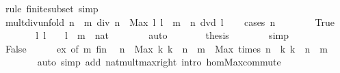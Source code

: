\begin{isabellebody}
\ {\isacharparenleft}{\kern0pt}rule\ finite{\isacharunderscore}{\kern0pt}subset{\isacharparenright}{\kern0pt}\ simp\isanewline
\ \ \isamarkupfalse%
\isanewline
\ \ \isamarkupfalse%
\ mult{\isacharunderscore}{\kern0pt}div{\isacharunderscore}{\kern0pt}unfold{\isacharcolon}{\kern0pt}\ {\isachardoublequoteopen}n\ {\isacharasterisk}{\kern0pt}\ {\isacharparenleft}{\kern0pt}m\ div\ n{\isacharparenright}{\kern0pt}\ {\isacharequal}{\kern0pt}\ Max\ {\isacharbraceleft}{\kern0pt}l{\isachardot}{\kern0pt}\ l\ {\isasymle}\ m\ {\isasymand}\ n\ dvd\ l{\isacharbraceright}{\kern0pt}{\isachardoublequoteclose}\isanewline
\ \ \isamarkupfalse%
\ {\isacharparenleft}{\kern0pt}cases\ {\isachardoublequoteopen}n\ {\isacharequal}{\kern0pt}\ {}{\isachardoublequoteclose}{\isacharparenright}{\kern0pt}\isanewline
\ \ \ \ \isamarkupfalse%
\ True\isanewline
\ \ \ \ \isamarkupfalse%
\ \isamarkupfalse%
\ {\isachardoublequoteopen}{\isacharbraceleft}{\kern0pt}l{\isachardot}{\kern0pt}\ l\ {\isacharequal}{\kern0pt}\ {}\ {\isasymand}\ l\ {\isasymle}\ m{\isacharbraceright}{\kern0pt}\ {\isacharequal}{\kern0pt}\ {\isacharbraceleft}{\kern0pt}{}{\isacharcolon}{\kern0pt}{\isacharcolon}{\kern0pt}nat{\isacharbraceright}{\kern0pt}{\isachardoublequoteclose}\isanewline
\ \ \ \ \ \ \isamarkupfalse%
\ auto\isanewline
\ \ \ \ \isamarkupfalse%
\ \isamarkupfalse%
\ {\isacharquery}{\kern0pt}thesis\isanewline
\ \ \ \ \ \ \isamarkupfalse%
\ simp\isanewline
\ \ \isamarkupfalse%
\isanewline
\ \ \ \ \isamarkupfalse%
\ False\isanewline
\ \ \ \ \isamarkupfalse%
\ ex\ {\isacharbrackleft}{\kern0pt}of\ m{\isacharbrackright}{\kern0pt}\ fin\ \isamarkupfalse%
\ {\isachardoublequoteopen}n\ {\isacharasterisk}{\kern0pt}\ Max\ {\isacharbraceleft}{\kern0pt}k{\isachardot}{\kern0pt}\ k\ {\isacharasterisk}{\kern0pt}\ n\ {\isasymle}\ m{\isacharbraceright}{\kern0pt}\ {\isacharequal}{\kern0pt}\ Max\ {\isacharparenleft}{\kern0pt}times\ n\ {\isacharbackquote}{\kern0pt}\ {\isacharbraceleft}{\kern0pt}k{\isachardot}{\kern0pt}\ k\ {\isacharasterisk}{\kern0pt}\ n\ {\isasymle}\ m{\isacharbraceright}{\kern0pt}{\isacharparenright}{\kern0pt}{\isachardoublequoteclose}\isanewline
\ \ \ \ \ \ \isamarkupfalse%
\ {\isacharparenleft}{\kern0pt}auto\ simp\ add{\isacharcolon}{\kern0pt}\ nat{\isacharunderscore}{\kern0pt}mult{\isacharunderscore}{\kern0pt}max{\isacharunderscore}{\kern0pt}right\ intro{\isacharcolon}{\kern0pt}\ hom{\isacharunderscore}{\kern0pt}Max{\isacharunderscore}{\kern0pt}commute{\isacharparenright}{\kern0pt}\isanewline

\end{isabellebody}
